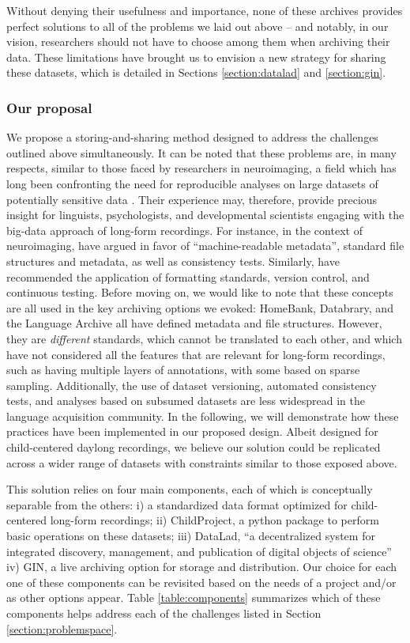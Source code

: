 \documentclass[smallextended]{svjour3}       %
\begin{document}
Without denying their usefulness and importance, none of these archives provides perfect solutions to all of the problems we laid out above -- and notably, in our vision, researchers should not have to choose among them when archiving their data.   These limitations have brought us to envision a new strategy for sharing these datasets, which is detailed in Sections \ref{section:datalad} and \ref{section:gin}.

 \subsubsection*{Our proposal}
 
We propose a storing-and-sharing method designed to address the challenges outlined above simultaneously. It can be noted that these problems are, in many respects, similar to those faced by researchers in neuroimaging, a field which has long been confronting the need for reproducible analyses on large datasets of potentially sensitive data \citep{Poldrack2014}.
Their experience may, therefore, provide precious insight for linguists, psychologists, and developmental scientists engaging with the big-data approach of long-form recordings.
For instance, in the context of neuroimaging, \citet{Gorgolewski2016} have argued in favor of ``machine-readable metadata'', standard file structures and metadata, as well as consistency tests. Similarly, \citet{Eglen2017} have recommended the application of formatting standards, version control, and continuous testing. Before moving on, we would like to note that these concepts are all used in the key archiving options we evoked: HomeBank, Databrary, and the Language Archive all have defined metadata and file structures. However, they are {\it different} standards, which cannot be translated to each other, and which have not considered all the features that are relevant for long-form recordings, such as having multiple layers of annotations, with some based on sparse sampling. Additionally, the use of dataset versioning, automated consistency tests, and analyses based on subsumed datasets are less widespread in the language acquisition community. In the following, we will demonstrate how these practices have been implemented in our proposed design.
Albeit designed for child-centered daylong recordings, we believe our solution could be replicated across a wider range of datasets with constraints similar to those exposed above.

This solution relies on four main components, each of which is conceptually separable from the others: i) a standardized data format optimized for child-centered long-form recordings; ii) ChildProject, a python package to perform basic operations on these datasets; iii) DataLad, ``a decentralized system for integrated discovery, management, and publication of digital objects of science'' \citep{hanke_defense_2021,datalad_paper} iv) GIN, a live archiving option for storage and distribution. Our choice for each one of these components can be revisited based on the needs of a project and/or as other options appear. Table \ref{table:components} summarizes which of these components helps address each of the challenges listed in Section \ref{section:problemspace}.
\end{document}
